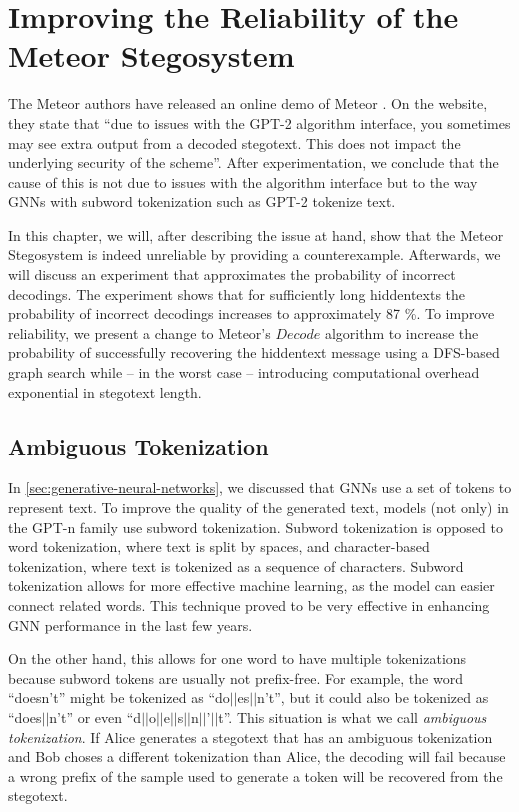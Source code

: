\chapter{Improving the Reliability of the Meteor Stegosystem}
\label{chap:reliability}

The Meteor authors have released an online demo of Meteor \cite{MeteorDemo2021}.
On the website, they state that ``due to issues with the GPT-2 algorithm interface, you sometimes may see extra output from a decoded stegotext. This does not impact the underlying security of the scheme''.
After experimentation, we conclude that the cause of this is not due to issues with the algorithm interface but to the way GNNs with subword tokenization such as GPT-2 tokenize text.

In this chapter, we will, after describing the issue at hand, show that the Meteor Stegosystem is indeed unreliable by providing a counterexample.
Afterwards, we will discuss an experiment that approximates the probability of incorrect decodings.
The experiment shows that for sufficiently long hiddentexts the probability of incorrect decodings increases to approximately 87 \%.
To improve reliability, we present a change to Meteor's $Decode$ algorithm to increase the probability of successfully recovering the hiddentext message using a DFS-based graph search while -- in the worst case -- introducing computational overhead exponential in stegotext length.

\section{Ambiguous Tokenization}
\label{sec:amb-tok}

In \autoref{sec:generative-neural-networks}, we discussed that GNNs use a set of tokens to represent text.
To improve the quality of the generated text, models (not only) in the GPT-n family use subword tokenization.
Subword tokenization is opposed to word tokenization, where text is split by spaces, and character-based tokenization, where text is tokenized as a sequence of characters.
Subword tokenization allows for more effective machine learning, as the model can easier connect related words.
This technique proved to be very effective in enhancing GNN performance in the last few years.

On the other hand, this allows for one word to have multiple tokenizations because subword tokens are usually not prefix-free.
For example, the word ``doesn't'' might be tokenized as ``do$||$es$||$n't'', but it could also be tokenized as ``does$||$n't'' or even ``d$||$o$||$e$||$s$||$n$||$'$||$t''.
This situation is what we call \emph{ambiguous tokenization}.
If Alice generates a stegotext that has an ambiguous tokenization and Bob choses a different tokenization than Alice, the decoding will fail because a wrong prefix of the sample used to generate a token will be recovered from the stegotext.


